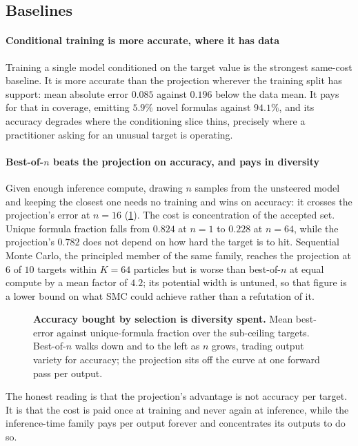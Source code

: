 \subsection{Baselines}
\label{sec:baselines}

\paragraph{Conditional training is more accurate, where it has data}
Training a single model conditioned on the target value is the strongest same-cost
baseline. It is more accurate than the projection wherever the training split has
support: mean absolute error $0.085$ against $0.196$ below the data mean. It pays for that
in coverage, emitting $5.9\%$ novel formulas against $94.1\%$, and its accuracy degrades
where the conditioning slice thins, precisely where a practitioner asking for an unusual
target is operating.

\paragraph{Best-of-$n$ beats the projection on accuracy, and pays in diversity}
Given enough inference compute, drawing $n$ samples from the unsteered model and keeping
the closest one needs no training and wins on accuracy: it crosses the projection's error
at $n = 16$ (\cref{fig:pareto}). The cost is concentration of the accepted set. Unique
formula fraction falls from $0.824$ at $n=1$ to $0.228$ at $n=64$, while the
projection's $0.782$ does not depend on how hard the target is to hit. Sequential Monte
Carlo, the principled member of the same family, reaches the projection at
$6$ of $10$ targets within $K=64$ particles but is worse than best-of-$n$ at equal
compute by a mean factor of $4.2$; its potential width is untuned, so that figure is a
lower bound on what SMC could achieve rather than a refutation of it.

\begin{figure}[t]
  \centering
  \caption{\textbf{Accuracy bought by selection is diversity spent.} Mean best-error
    against unique-formula fraction over the sub-ceiling targets. Best-of-$n$ walks down
    and to the left as $n$ grows, trading output variety for accuracy; the projection sits
    off the curve at one forward pass per output.}
  \label{fig:pareto}
\end{figure}

The honest reading is that the projection's advantage is not accuracy per target. It is
that the cost is paid once at training and never again at inference, while the
inference-time family pays per output forever and concentrates its outputs to do so.


